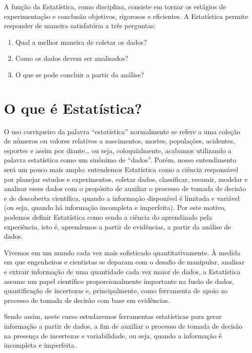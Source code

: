 \documentclass[
]{book}
\theoremstyle{definition}
\theoremstyle{definition}
\theoremstyle{definition}
\theoremstyle{remark}
\begin{document}
A função da Estatística, como disciplina, consiste em tornar os estágios de experimentação e conclusão objetivos, rigorosos e eficientes. A Estatística permite responder de maneira satisfatória a três perguntas:

\begin{enumerate}
\def\labelenumi{(\arabic{enumi})}
\item
  Qual a melhor maneira de coletar os dados?
\item
  Como os dados devem ser analisados?
\item
  O que se pode concluir a partir da análise?
\end{enumerate}

\hypertarget{o-que-uxe9-estatuxedstica}{%
\section{O que é Estatística?}\label{o-que-uxe9-estatuxedstica}}

O uso corriqueiro da palavra ``estatística'' normalmente se refere a uma coleção de números ou valores relativos a nascimentos, mortes, populações, acidentes, esportes e assim por diante\ldots{} ou seja, coloquialmente, acabamos utilizando a palavra estatística como um sinônimo de ``dados''. Porém, nosso entendimento será um pouco mais amplo: entendemos Estatística como a ciência responsável por planejar estudos e experimentos, coletar dados, classificar, resumir, modelar e analisar esses dados com o propósito de auxiliar o processo de tomada de decisão e de descoberta científica, quando a informação disponível é limitada e variável (ou seja, quando há informação incompleta e imperfeita). Por este motivo, podemos definir Estatística como sendo a ciência do aprendizado pela experiência, isto é, aprendemos a partir de evidências, a partir da análise de dados.

Vivemos em um mundo cada vez mais sofisticado quantitativamente. À medida em que engenheiros e cientistas se deparam com o desafio de manipular, analisar e extrair informação de uma quantidade cada vez maior de dados, a Estatística assume um papel científico proporcionalmente importante na fusão de dados, quantificação de incertezas e, principalmente, como ferramenta de apoio ao processo de tomada de decisão com base em evidências.

Sendo assim, neste curso estudaremos ferramentas estatísticas para gerar informação a partir de dados, a fim de auxiliar o processo de tomada de decisão na presença de incertezas e variabilidade, ou seja, quando a informação é incompleta e imperfeita.
\end{document}
